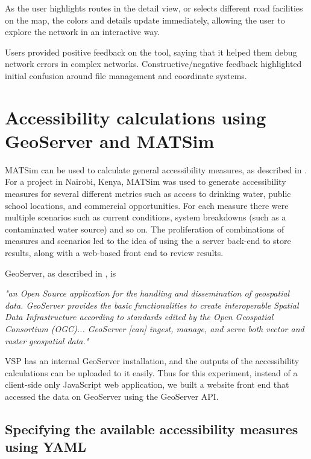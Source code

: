 As the user highlights routes in the detail view, or selects different road facilities on the map, the colors and details update immediately, allowing the user to explore the network in an interactive way.

Users provided positive feedback on the tool, saying that it helped them debug network errors in complex networks. Constructive/negative feedback highlighted initial confusion around file management and coordinate systems.

\hypertarget{server-experiments-geoserver}{%
\section{Accessibility calculations using GeoServer and MATSim}\label{server-experiments-geoserver}}

MATSim can be used to calculate general accessibility measures, as described in \cite{ziemke2018accessibility}. For a project in Nairobi, Kenya, MATSim was used to generate accessibility measures for several different metrics such as access to drinking water, public school locations, and commercial opportunities. For each measure there were multiple scenarios such as current conditions, system breakdowns (such as a contaminated water source) and so on. The proliferation of combinations of measures and scenarios led to the idea of using the a server back-end to store results, along with a web-based front end to review results.

GeoServer, as described in \cite{giannecchini2013geoserver}, is

\begin{displayquote}
\emph{"an Open Source application for the handling and dissemination of geospatial data. GeoServer provides the basic functionalities to create interoperable Spatial Data Infrastructure according to standards edited by the Open Geospatial Consortium (OGC)... GeoServer [can] ingest, manage, and serve both vector and raster geospatial data."}
\end{displayquote}

VSP has an internal GeoServer installation, and the outputs of the accessibility calculations can be uploaded to it easily. Thus for this experiment, instead of a client-side only JavaScript web application, we built a website front end that accessed the data on GeoServer using the GeoServer API.

\hypertarget{server-experiments-geoserver-2}{%
\subsection{Specifying the available accessibility measures using YAML}
\label{server-experiments-geoserver-2}}

